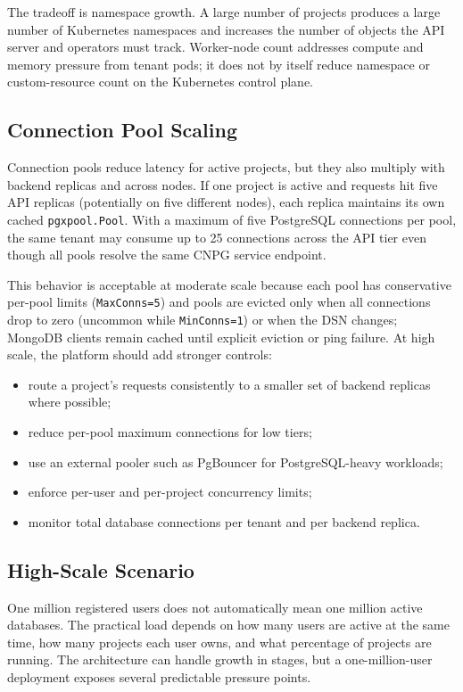 The tradeoff is namespace growth. A large number of projects produces a large number of Kubernetes namespaces and increases the number of objects the API server and operators must track. Worker-node count addresses compute and memory pressure from tenant pods; it does not by itself reduce namespace or custom-resource count on the Kubernetes control plane.

\subsection{Connection Pool Scaling}

Connection pools reduce latency for active projects, but they also multiply with backend replicas and across nodes. If one project is active and requests hit five API replicas (potentially on five different nodes), each replica maintains its own cached \texttt{pgxpool.Pool}. With a maximum of five PostgreSQL connections per pool, the same tenant may consume up to 25 connections across the API tier even though all pools resolve the same CNPG service endpoint.

This behavior is acceptable at moderate scale because each pool has conservative per-pool limits (\texttt{MaxConns=5}) and pools are evicted only when all connections drop to zero (uncommon while \texttt{MinConns=1}) or when the DSN changes; MongoDB clients remain cached until explicit eviction or ping failure. At high scale, the platform should add stronger controls:

\begin{itemize}
    \item route a project's requests consistently to a smaller set of backend replicas where possible;
    \item reduce per-pool maximum connections for low tiers;
    \item use an external pooler such as PgBouncer for PostgreSQL-heavy workloads;
    \item enforce per-user and per-project concurrency limits;
    \item monitor total database connections per tenant and per backend replica.
\end{itemize}

\subsection{High-Scale Scenario}

One million registered users does not automatically mean one million active databases. The practical load depends on how many users are active at the same time, how many projects each user owns, and what percentage of projects are running. The architecture can handle growth in stages, but a one-million-user deployment exposes several predictable pressure points.

